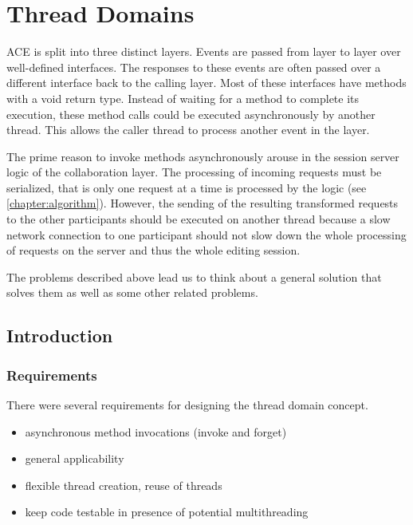 \chapter{Thread Domains}
\label{chapter:threaddomains}

ACE is split into three distinct layers. Events are passed from layer to
layer over well-defined interfaces. The responses to these events are often 
passed over
a different interface back to the calling layer. Most of these interfaces
have methods with a void return type. Instead of waiting for a method
to complete its execution, these method calls could be executed 
asynchronously by
another thread. This allows the caller thread to process another event
in the layer.

The prime reason to invoke methods asynchronously arouse in the session server
logic of the collaboration layer. The processing of incoming requests
must be serialized, that is only one request at a time is processed by
the logic (see \ref{chapter:algorithm}). However, the sending of the
resulting transformed requests to the other participants should be executed
on another thread because a slow network connection to one participant
should not slow down the whole processing of requests on the server and thus
the whole editing session.

The problems described above lead us to think about a general solution that 
solves them as well as some other related problems.



\section{Introduction}

\subsection{Requirements}
There were several requirements for designing the thread domain concept.

\begin{itemize}
 \item asynchronous method invocations (invoke and forget)
 \item general applicability
 \item flexible thread creation, reuse of threads
 \item keep code testable in presence of potential multithreading
\end{itemize}

